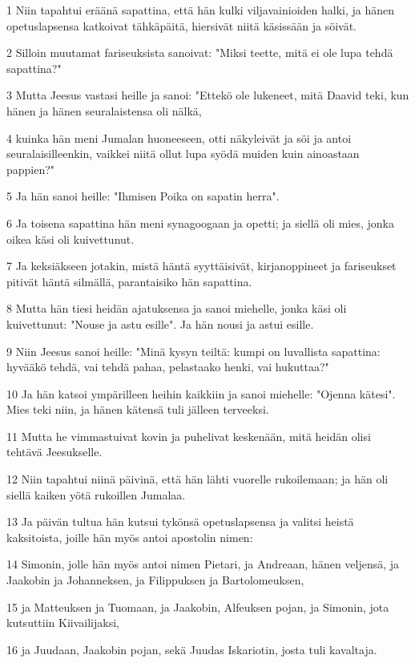 \par 1 Niin tapahtui eräänä sapattina, että hän kulki viljavainioiden halki, ja hänen opetuslapsensa katkoivat tähkäpäitä, hiersivät niitä käsissään ja söivät.
\par 2 Silloin muutamat fariseuksista sanoivat: "Miksi teette, mitä ei ole lupa tehdä sapattina?"
\par 3 Mutta Jeesus vastasi heille ja sanoi: "Ettekö ole lukeneet, mitä Daavid teki, kun hänen ja hänen seuralaistensa oli nälkä,
\par 4 kuinka hän meni Jumalan huoneeseen, otti näkyleivät ja söi ja antoi seuralaisilleenkin, vaikkei niitä ollut lupa syödä muiden kuin ainoastaan pappien?"
\par 5 Ja hän sanoi heille: "Ihmisen Poika on sapatin herra".
\par 6 Ja toisena sapattina hän meni synagoogaan ja opetti; ja siellä oli mies, jonka oikea käsi oli kuivettunut.
\par 7 Ja keksiäkseen jotakin, mistä häntä syyttäisivät, kirjanoppineet ja fariseukset pitivät häntä silmällä, parantaisiko hän sapattina.
\par 8 Mutta hän tiesi heidän ajatuksensa ja sanoi miehelle, jonka käsi oli kuivettunut: "Nouse ja astu esille". Ja hän nousi ja astui esille.
\par 9 Niin Jeesus sanoi heille: "Minä kysyn teiltä: kumpi on luvallista sapattina: hyvääkö tehdä, vai tehdä pahaa, pelastaako henki, vai hukuttaa?"
\par 10 Ja hän katsoi ympärilleen heihin kaikkiin ja sanoi miehelle: "Ojenna kätesi". Mies teki niin, ja hänen kätensä tuli jälleen terveeksi.
\par 11 Mutta he vimmastuivat kovin ja puhelivat keskenään, mitä heidän olisi tehtävä Jeesukselle.
\par 12 Niin tapahtui niinä päivinä, että hän lähti vuorelle rukoilemaan; ja hän oli siellä kaiken yötä rukoillen Jumalaa.
\par 13 Ja päivän tultua hän kutsui tykönsä opetuslapsensa ja valitsi heistä kaksitoista, joille hän myös antoi apostolin nimen:
\par 14 Simonin, jolle hän myös antoi nimen Pietari, ja Andreaan, hänen veljensä, ja Jaakobin ja Johanneksen, ja Filippuksen ja Bartolomeuksen,
\par 15 ja Matteuksen ja Tuomaan, ja Jaakobin, Alfeuksen pojan, ja Simonin, jota kutsuttiin Kiivailijaksi,
\par 16 ja Juudaan, Jaakobin pojan, sekä Juudas Iskariotin, josta tuli kavaltaja.
